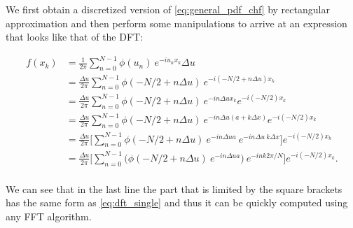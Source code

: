  We first obtain a discretized version of \eqref{eq:general_pdf_chf} by rectangular approximation and then perform some manipulations to arrive at an expression that looks like that of the DFT:
 
 \begin{equation*}
 \begin{split}
 f(x_k) &= \frac{1}{2 \pi} \sum_{n=0}^{N-1} \phi( u_n) \: e^{-i u_n x_k} \Delta u \\
 &= \frac{\Delta u}{2 \pi} \sum_{n=0}^{N-1} \phi(-N/2 + n \Delta u) \: e^{-i (-N/2 + n \Delta u) x_k}  \\
 &= \frac{\Delta u}{2 \pi} \sum_{n=0}^{N-1} \phi(-N/2 + n \Delta u) \: e^{-i n \Delta u x_k} e^{-i (-N/2) x_k}\\
 & = \frac{\Delta u}{2 \pi} \sum_{n=0}^{N-1} \phi(-N/2 + n \Delta u) \: e^{-i n \Delta u (a + k \Delta x) } e^{-i (-N/2) x_k} \\
 & = \frac{\Delta u}{2 \pi} \bigg[\sum_{n=0}^{N-1} \phi(-N/2 + n \Delta u) \:e^{-i n \Delta u a  }\: e^{-i n \Delta u \:k \Delta x }\Big] e^{-i (-N/2) x_k} \\
 & = \frac{\Delta u}{2 \pi} \bigg[\sum_{n=0}^{N-1} \bigg(\phi(-N/2 + n \Delta u) \:e^{-i n \Delta u a  }\bigg)\: e^{-i n k 2\pi/N}\Big] e^{-i (-N/2) x_k} .\\
 \end{split}
 \end{equation*}
 
 We can see that in the last line the part that is limited by the square brackets has the same form as  \eqref{eq:dft_single} and thus it can be quickly computed using any FFT algorithm.



